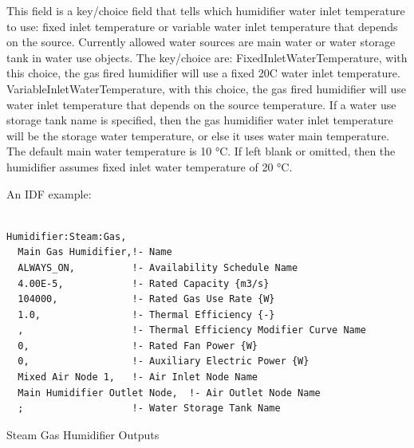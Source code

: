 This field is a key/choice field that tells which humidifier water inlet temperature to use: fixed inlet temperature or variable water inlet temperature that depends on the source. Currently allowed water sources are main water or water storage tank in water use objects. The key/choice are: FixedInletWaterTemperature, with this choice, the gas fired humidifier will use a fixed 20C water inlet temperature. VariableInletWaterTemperature, with this choice, the gas fired humidifier will use water inlet temperature that depends on the source temperature. If a water use storage tank name is specified, then the gas humidifier water inlet temperature will be the storage water temperature, or else it uses water main temperature. The default main water temperature is 10 °C. If left blank or omitted, then the humidifier assumes fixed inlet water temperature of 20 °C.

An IDF example:

\begin{lstlisting}

Humidifier:Steam:Gas,
  Main Gas Humidifier,!- Name
  ALWAYS_ON,          !- Availability Schedule Name
  4.00E-5,            !- Rated Capacity {m3/s}
  104000,             !- Rated Gas Use Rate {W}
  1.0,                !- Thermal Efficiency {-}
  ,                   !- Thermal Efficiency Modifier Curve Name
  0,                  !- Rated Fan Power {W}
  0,                  !- Auxiliary Electric Power {W}
  Mixed Air Node 1,   !- Air Inlet Node Name
  Main Humidifier Outlet Node,  !- Air Outlet Node Name
  ;                   !- Water Storage Tank Name
\end{lstlisting}

Steam Gas Humidifier Outputs


